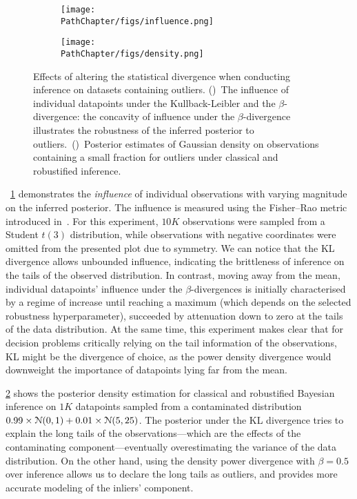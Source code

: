 \begin{figure*}[!t]
	\begin{subfigure}[t]{0.49\textwidth} 
	\centering
	\texttt{[image: \\PathChapter/figs/influence.png]}
	\caption{\centering {}}
	\label{fig:influence}
	\end{subfigure}	
	\begin{subfigure}[t]{0.49\textwidth} 
	\centering
	\texttt{[image: \\PathChapter/figs/density.png]}
	\caption{\centering {}}
	\label{fig:gaussian-density}
	\end{subfigure}	
	\caption{Effects of altering the statistical divergence when conducting inference on datasets containing outliers. ()~The influence of individual datapoints under the Kullback-Leibler and the $\beta$-divergence: the concavity of influence under the $\beta$-divergence illustrates the robustness of the inferred posterior to outliers.~()~Posterior estimates of Gaussian density on observations containing a small fraction for outliers under classical and robustified inference.}
	\label{fig:robust-inference}
\end{figure*}

~\cref{fig:influence} demonstrates the \emph{influence} of individual observations with varying magnitude on the inferred posterior. The influence is measured using the Fisher--Rao metric introduced in~\citep{kurtek15}. For this experiment, $10K$ observations were sampled from a Student $t(3)$ distribution, while observations with negative coordinates were omitted from the presented plot due to symmetry. We can notice that the KL divergence allows unbounded influence, indicating the brittleness of inference on the tails of the observed distribution. In contrast, moving away from the mean, individual datapoints' influence under the $\beta$-divergences is initially characterised by a regime of increase until reaching a maximum (which depends on the selected robustness hyperparameter), succeeded by attenuation down to zero at the tails of the data distribution. At the same time, this experiment makes clear that for decision problems critically relying on the tail information of the observations, KL might be the divergence of choice, as the power density divergence would downweight the importance of datapoints lying far from the mean. 

\cref{fig:gaussian-density} shows the posterior density estimation for classical and robustified Bayesian inference on $1K$ datapoints sampled from a contaminated distribution $0.99\times\mathcal{N}(0,1)+0.01\times\mathcal{N}(5,25)$. The posterior under the KL divergence tries to explain the long tails of the observations---which are the effects of the contaminating component---eventually overestimating the variance of the data distribution. On the other hand, using the density power divergence with $\beta=0.5$ over inference allows us to declare the long tails as outliers, and provides more accurate modeling of the inliers' component.


